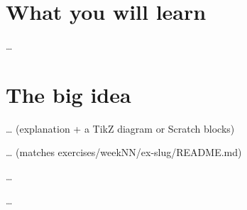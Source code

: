 
\section{What you will learn}
…

\section{The big idea}
… (explanation + a TikZ diagram or Scratch blocks)

\begin{exercise}[Name]
… (matches exercises/weekNN/ex-slug/README.md)
\end{exercise}

\begin{exercise}[Name]
…
\end{exercise}

\begin{vocab}
\end{vocab}

\begin{reflection}
  … 
\end{reflection}
